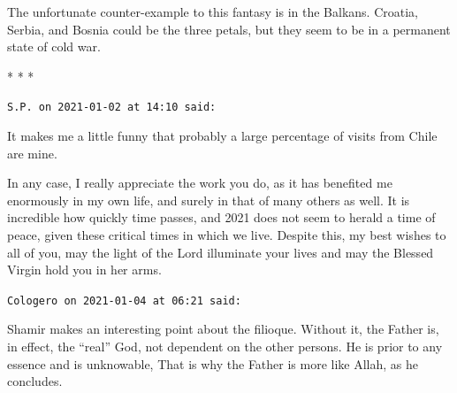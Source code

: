 The unfortunate counter-example to this fantasy is in the Balkans. Croatia, Serbia, and Bosnia could be the three petals, but they seem to be in a permanent state of cold war.



\begin{center}* * *\end{center}

\begin{footnotesize}
\begin{sffamily}
\texttt{S.P. on 2021-01-02 at 14:10 said:}

It makes me a little funny that probably a large percentage of visits from Chile are mine.

In any case, I really appreciate the work you do, as it has benefited me enormously in my own life, and surely in that of many others as well. It is incredible how quickly time passes, and 2021 does not seem to herald a time of peace, given these critical times in which we live. Despite this, my best wishes to all of you, may the light of the Lord illuminate your lives and may the Blessed Virgin hold you in her arms.

\hfill

\texttt{Cologero on 2021-01-04 at 06:21 said:}

Shamir makes an interesting point about the filioque. Without it, the Father is, in effect, the ``real'' God, not dependent on the other persons. He is prior to any essence and is unknowable, That is why the Father is more like Allah, as he concludes.


\hfill

\end{sffamily}
\end{footnotesize}

